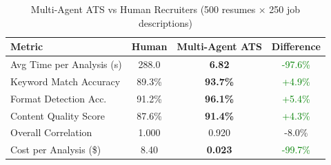 \begin{table}[h]
\centering
\caption{Multi-Agent ATS vs Human Recruiters (500 resumes × 250 job descriptions)}
\label{tab:ats_performance}
\begin{tabular}{lccc}
\toprule
\textbf{Metric} & \textbf{Human} & \textbf{Multi-Agent ATS} & \textbf{Difference} \\
\midrule
Avg Time per Analysis (s) & 288.0 & \textbf{6.82} & \textcolor{green}{-97.6\%} \\
Keyword Match Accuracy    & 89.3\% & \textbf{93.7\%} & \textcolor{green}{+4.9\%} \\
Format Detection Acc.     & 91.2\% & \textbf{96.1\%} & \textcolor{green}{+5.4\%} \\
Content Quality Score     & 87.6\% & \textbf{91.4\%} & \textcolor{green}{+4.3\%} \\
Overall Correlation       & 1.000  & 0.920 & -8.0\% \\
Cost per Analysis (\$)    & 8.40   & \textbf{0.023} & \textcolor{green}{-99.7\%} \\
\bottomrule
\end{tabular}
\end{table}
